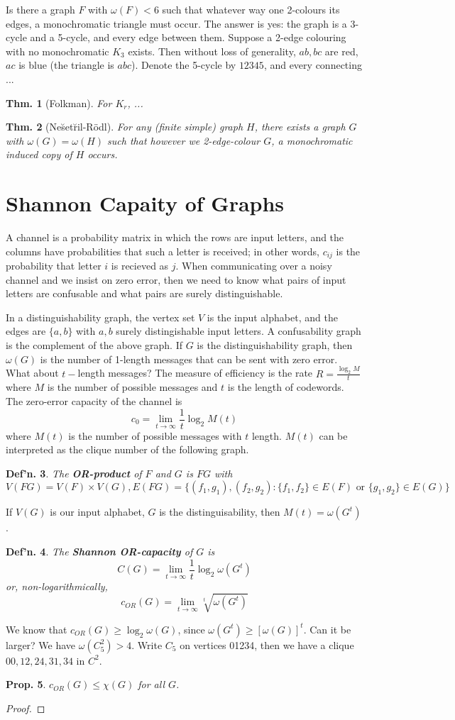 \documentclass[12pt, a4paper]{book}
\newtheorem{theorem}{Thm.}[section]
\newtheorem{definition}[theorem]{Def'n.}
\newtheorem{proposition}[theorem]{Prop.}
\theoremstyle{nonumberplain}
\newtheorem{proof}{Proof}
\begin{document}
Is there a graph $F$ with $\omega(F)<6$ such that whatever way one 2-colours its edges, a monochromatic triangle must occur.
The answer is yes: the graph is a 3-cycle and a 5-cycle, and every edge between them.
Suppose a 2-edge colouring with no monochromatic $K_3$ exists.
Then without loss of generality, $ab,bc$ are red, $ac$ is blue (the triangle is $abc$).
Denote the 5-cycle by $12345$, and every connecting ...
\begin{theorem}[Folkman]
    For $K_r$, ...
\end{theorem}
\begin{theorem}[Ne\u{s}et\u{r}il-R\"odl]
    For any (finite simple) graph $H$, there exists a graph $G$ with $\omega(G)=\omega(H)$ such that however we 2-edge-colour $G$, a monochromatic induced copy of $H$ occurs.
\end{theorem}
\section{Shannon Capaity of Graphs}
A channel is a probability matrix in which the rows are input letters, and the columns have probabilities that such a letter is received; in other words, $c_{ij}$ is the probability that letter $i$ is recieved as $j$.
When communicating over a noisy channel and we insist on zero error, then we need to know what pairs of input letters are confusable and what pairs are surely distinguishable.

In a distinguishability graph, the vertex set $V$ is the input alphabet, and the edges are $\{a,b\}$ with $a,b$ surely distingishable input letters.
A confusability graph is the complement of the above graph.
If $G$ is the distinguishability graph, then $\omega(G)$ is the number of 1-length messages that can be sent with zero error.
What about $t-$length messages?
The measure of efficiency is the rate $R=\frac{\log_2M}{t}$ where $M$ is the number of possible messages and $t$ is the length of codewords.
The zero-error capacity of the channel is
\[c_0=\lim_{t\to\infty}\frac{1}{t}\log_2 M(t)\]
where $M(t)$ is the number of possible messages with $t$ length.
$M(t)$ can be interpreted as the clique number of the following graph.
\begin{definition}
    The \textbf{OR-product} of $F$ and $G$ is $FG$ with
    \[V(FG)=V(F)\times V(G),E(FG)=\{{(f_1,g_1),(f_2,g_2)}:\{f_1,f_2\}\in E(F)\text{ or }\{g_1,g_2\}\in E(G)\}\]
\end{definition}
If $V(G)$ is our input alphabet, $G$ is the distinguisability, then $M(t)=\omega(G^t)$.
\begin{definition}
    The \textbf{Shannon OR-capacity} of $G$ is
    \[C(G)=\lim_{t\to\infty}\frac{1}{t}\log_2\omega(G^t)\]
    or, non-logarithmically,
    \[c_{OR}(G)=\lim_{t\to\infty}\sqrt[t]{\omega(G^t)}\]
\end{definition}
We know that $c_{OR}(G)\geq\log_2\omega(G)$, since $\omega(G^t)\geq[\omega(G)]^t$.
Can it be larger?
We have $\omega(C_5^2)>4$.
Write $C_5$ on vertices 01234, then we have a clique $00,12,24,31,34$ in $C^2$.

\begin{proposition}
    $c_{OR}(G)\leq\chi(G)$ for all $G$.
\end{proposition}
\begin{proof}
\end{proof}
\end{document}
